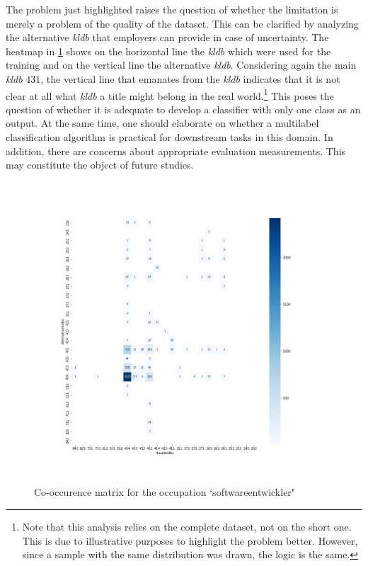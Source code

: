 \documentclass[12pt, a4paper, titlepage]{article}
\begin{document}
The problem just highlighted raises the question of whether the limitation is merely a problem of the quality of the dataset. This can be clarified by analyzing the alternative \textit{kldb} that employers can provide in case of uncertainty. The heatmap in \ref{fig: F28} shows on the horizontal line the \textit{kldb} which were used for the training and on the vertical line the alternative \textit{kldb}. Considering again the main \textit{kldb} $431$, the vertical line that emanates from the \textit{kldb} indicates that it is not clear at all what \textit{kldb} a title might belong in the real world.\footnote{Note that this analysis relies on the complete dataset, not on the short one. This is due to illustrative purposes to highlight the problem better. However, since a sample with the same distribution was drawn, the logic is the same.} This poses the question of whether it is adequate to develop a classifier with only one class as an output. At the same time, one should elaborate on whether a multilabel classification algorithm is practical for downstream tasks in this domain. In addition, there are concerns about appropriate evaluation measurements. This may constitute the object of future studies.

\begin{figure}[hb!]
  \center
  \includegraphics[scale=0.5]{co_occurence_softwareentwickler.jpg}
  \caption{\label{fig: F28} Co-occurence matrix for the occupation `softwareentwickler"}
\end{figure}
\end{document}

